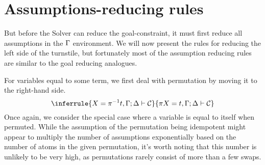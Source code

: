 \documentclass[english, mgr]{iithesis}
\begin{document}
\section{Assumptions-reducing rules}
But before the Solver can reduce the goal-constraint, it must first reduce all assumptions in the $\Gamma$ environment.
We will now present the rules for reducing the left side of the turnstile,
but fortunately most of the assumption reducing rules are similar to the goal reducing analogues.

For variables equal to some term,
we first deal with permutation by moving it to the right-hand side.
$$
\inferrule{
   \termv = \pi^{-1} \term, \cEnv ; \icEnv \solverRule \sconstr
}{
   \pi \termv = \term, \cEnv ; \icEnv \solverRule \sconstr
}
$$
Once again, we consider the special case where a variable is equal to itself when permuted.
While the assumption of the permutation being idempotent might appear to multiply the number of assumptions exponentially based on the number of atoms in the given permutation,
it's worth noting that this number is unlikely to be very high, as permutations rarely consist of more than a few swaps.
\end{document}
